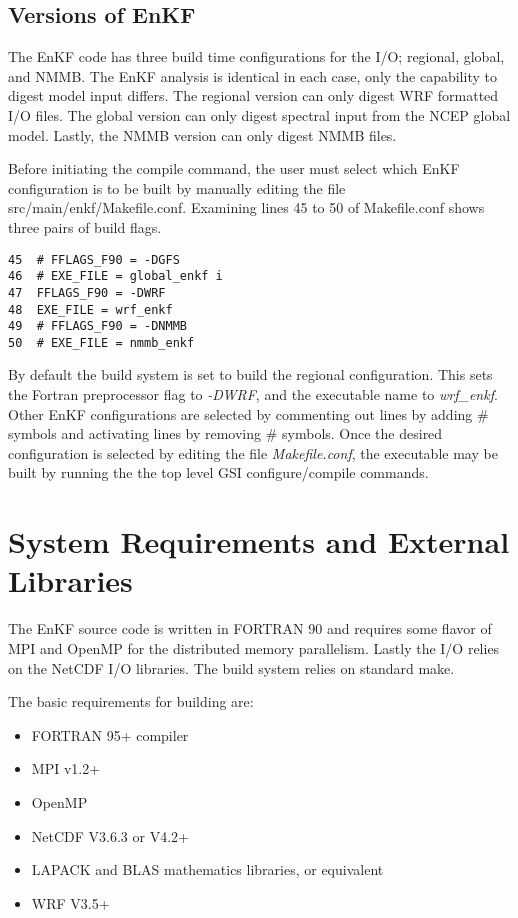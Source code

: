 \subsection{Versions of EnKF} \label{ch2_versions_enkf}

The EnKF code has three build time configurations for the I/O; regional, global, and NMMB. The EnKF analysis is identical in each case, only the capability to digest model input differs. The regional version can only digest WRF formatted I/O files. The global version can only digest spectral input from the NCEP global model. Lastly, the NMMB version can only digest NMMB files.

Before initiating the compile command, the user must select which EnKF configuration is to be built by manually editing the file src/main/enkf/Makefile.conf. Examining lines 45 to 50 of Makefile.conf shows three pairs of build flags.
\begin{verbatim}
45  # FFLAGS_F90 = -DGFS 
46  # EXE_FILE = global_enkf i
47  FFLAGS_F90 = -DWRF
48  EXE_FILE = wrf_enkf
49  # FFLAGS_F90 = -DNMMB 
50  # EXE_FILE = nmmb_enkf
\end{verbatim}

By default the build system is set to build the regional configuration. This sets the Fortran preprocessor flag to \textit{-DWRF}, and the executable name to \textit{wrf\_enkf}. Other EnKF configurations are selected by commenting out lines by adding \# symbols and activating lines by removing \# symbols. Once the desired configuration is selected by editing the file \textit{Makefile.conf}, the executable may be built by running the the top level GSI configure/compile commands.

\section{System Requirements and External Libraries} \label{ch2_system_requirements}

The EnKF source code is written in FORTRAN 90 and requires some flavor of MPI and OpenMP for the distributed memory parallelism. Lastly the I/O relies on the NetCDF I/O libraries. The build system relies on standard make.

The basic requirements for building are:
\begin{itemize}
\item FORTRAN 95+ compiler
\item MPI v1.2+
\item OpenMP
\item NetCDF V3.6.3 or V4.2+
\item LAPACK and BLAS mathematics libraries, or equivalent 
\item WRF V3.5+
\end{itemize}

